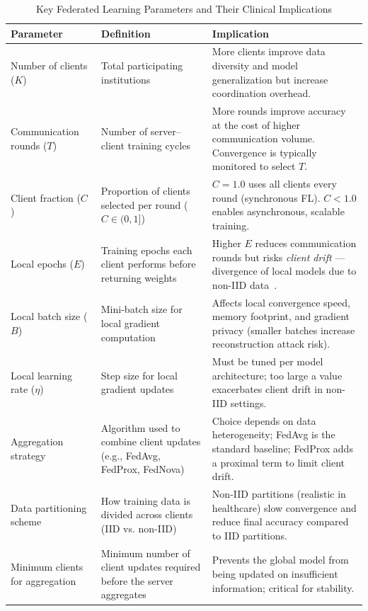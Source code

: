 \begin{table}[ht]
\centering
\caption{Key Federated Learning Parameters and Their Clinical Implications}
\label{tab:fl_params}
\begin{tabular}{|p{3.2cm}|p{4.2cm}|p{5.8cm}|}
\hline
\textbf{Parameter} & \textbf{Definition} & \textbf{Implication} \\
\hline
Number of clients ($K$)
    & Total participating institutions
    & More clients improve data diversity and model generalization but
      increase coordination overhead. \\
\hline
Communication rounds ($T$)
    & Number of server--client training cycles
    & More rounds improve accuracy at the cost of higher communication
      volume. Convergence is typically monitored to select $T$. \\
\hline
Client fraction ($C$)
    & Proportion of clients selected per round ($C \in (0,1]$)
    & $C = 1.0$ uses all clients every round (synchronous FL).
      $C < 1.0$ enables asynchronous, scalable training. \\
\hline
Local epochs ($E$)
    & Training epochs each client performs before returning weights
    & Higher $E$ reduces communication rounds but risks \textit{client drift}
      — divergence of local models due to non-IID data~\cite{li2020}. \\
\hline
Local batch size ($B$)
    & Mini-batch size for local gradient computation
    & Affects local convergence speed, memory footprint, and gradient
      privacy (smaller batches increase reconstruction attack risk). \\
\hline
Local learning rate ($\eta$)
    & Step size for local gradient updates
    & Must be tuned per model architecture; too large a value exacerbates
      client drift in non-IID settings. \\
\hline
Aggregation strategy
    & Algorithm used to combine client updates (e.g., FedAvg, FedProx,
      FedNova)
    & Choice depends on data heterogeneity; FedAvg is the standard baseline;
      FedProx adds a proximal term to limit client drift. \\
\hline
Data partitioning scheme
    & How training data is divided across clients (IID vs. non-IID)
    & Non-IID partitions (realistic in healthcare) slow convergence and
      reduce final accuracy compared to IID partitions. \\
\hline
Minimum clients for aggregation
    & Minimum number of client updates required before the server aggregates
    & Prevents the global model from being updated on insufficient
      information; critical for stability. \\
\hline
\end{tabular}
\end{table}
 
